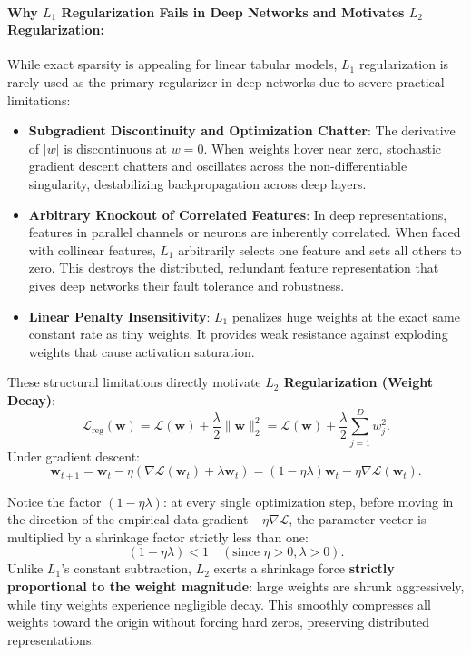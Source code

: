 \paragraph{Why $L_1$ Regularization Fails in Deep Networks and Motivates $L_2$ Regularization:}
While exact sparsity is appealing for linear tabular models, $L_1$ regularization is rarely used as the primary regularizer in deep networks due to severe practical limitations:
\begin{itemize}[noitemsep,topsep=2pt,parsep=0pt,partopsep=0pt]
  \item \textbf{Subgradient Discontinuity and Optimization Chatter}: The derivative of $|w|$ is discontinuous at $w = 0$. When weights hover near zero, stochastic gradient descent chatters and oscillates across the non-differentiable singularity, destabilizing backpropagation across deep layers.
  \item \textbf{Arbitrary Knockout of Correlated Features}: In deep representations, features in parallel channels or neurons are inherently correlated. When faced with collinear features, $L_1$ arbitrarily selects one feature and sets all others to zero. This destroys the distributed, redundant feature representation that gives deep networks their fault tolerance and robustness.
  \item \textbf{Linear Penalty Insensitivity}: $L_1$ penalizes huge weights at the exact same constant rate as tiny weights. It provides weak resistance against exploding weights that cause activation saturation.
\end{itemize}

These structural limitations directly motivate \textbf{$L_2$ Regularization (Weight Decay)}:
\begin{equation}
\mathcal{L}_{\text{reg}}(\mathbf{w}) = \mathcal{L}(\mathbf{w}) + \frac{\lambda}{2} \|\mathbf{w}\|_2^2 = \mathcal{L}(\mathbf{w}) + \frac{\lambda}{2} \sum_{j=1}^D w_j^2.
\label{eq:deep_weight_decay_loss}
\end{equation}
Under gradient descent:
\begin{equation}
\mathbf{w}_{t+1} = \mathbf{w}_t - \eta \left( \nabla \mathcal{L}(\mathbf{w}_t) + \lambda \mathbf{w}_t \right) = (1 - \eta \lambda) \mathbf{w}_t - \eta \nabla \mathcal{L}(\mathbf{w}_t).
\label{eq:weight_decay_step}
\end{equation}

\begin{intuition}
Notice the factor $(1 - \eta \lambda)$: at every single optimization step, before moving in the direction of the empirical data gradient $-\eta \nabla \mathcal{L}$, the parameter vector is multiplied by a shrinkage factor strictly less than one:
\begin{equation}
(1 - \eta \lambda) < 1 \quad (\text{since } \eta > 0, \lambda > 0).
\end{equation}
Unlike $L_1$'s constant subtraction, $L_2$ exerts a shrinkage force \textbf{strictly proportional to the weight magnitude}: large weights are shrunk aggressively, while tiny weights experience negligible decay. This smoothly compresses all weights toward the origin without forcing hard zeros, preserving distributed representations.
\end{intuition}

